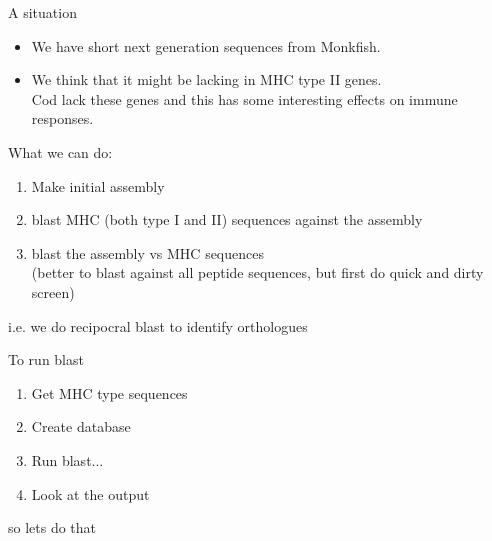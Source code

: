\documentclass[pdf]{beamer}
\begin{document}
\begin{frame}{A situation}
  \begin{itemize}
  \item We have short next generation sequences from Monkfish.
  \item We think that it might be lacking in MHC type II genes.\\
    Cod lack these genes and this has some interesting effects on
    immune responses.
  \end{itemize}
  
  What we can do:
  \begin{enumerate}
  \item Make initial assembly
  \item blast MHC (both type I and II) sequences against the assembly
  \item blast the assembly vs MHC sequences\\
    (better to blast against all peptide sequences, but first do quick and
    dirty screen)
  \end{enumerate}
  
  i.e. we do recipocral blast to identify orthologues
  
\end{frame}

\begin{frame}{To run blast}
  \begin{enumerate}
  \item Get MHC type sequences
  \item Create database
  \item Run blast...
  \item Look at the output
  \end{enumerate}

  so lets do that
\end{frame}
\end{document}
